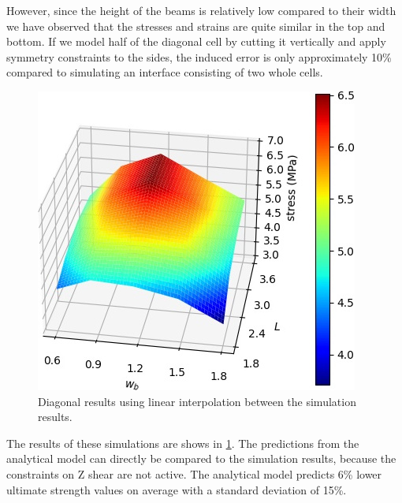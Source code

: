 However, since the height of the beams is relatively low compared to their width we have observed that the stresses and strains are quite similar in the top and bottom.
If we model half of the diagonal cell by cutting it vertically and apply symmetry constraints to the sides,
the induced error is only approximately 10\% compared to simulating an interface consisting of two whole cells.



\begin{figure}
	\centering
	\includegraphics[width=.7\columnwidth]{sources/simulation/diagonal_sim_response.jpg}
	\caption{Diagonal results using linear interpolation between the simulation results.}
	\label{fig:sim_diagonal_model}
\end{figure}


The results of these simulations are shows in \cref{fig:sim_diagonal_model}.
The predictions from the analytical model can directly be compared to the simulation results, because the constraints on Z shear are not active.
The analytical model predicts 6\% lower ultimate strength values on average with a standard deviation of 15\%.









